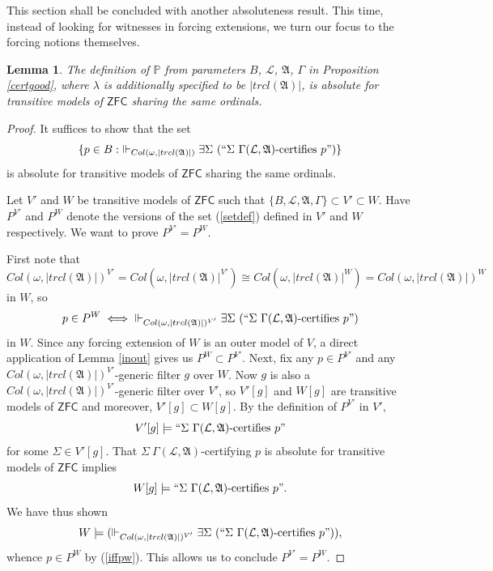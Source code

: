 \documentclass[12pt, twoside]{memoir}
\numberwithin{equation}{section}
\newtheorem{lem}[thm]{Lemma}
\theoremstyle{definition}
\theoremstyle{remark}
\theoremstyle{definition}
\theoremstyle{definition}
\theoremstyle{definition}
\theoremstyle{remark}
\begin{document}
This section shall be concluded with another absoluteness result. This time, instead of looking for witnesses in forcing extensions, we turn our focus to the forcing notions themselves.

\begin{lem}\label{Pisabs}
The definition of $\mathbb{P}$ from parameters $B$, $\mathcal{L}$, $\mathfrak{A}$, $\Gamma$ in Proposition \ref{certgood}, where $\lambda$ is additionally specified to be $|trcl(\mathfrak{A})|$, is absolute for transitive models of $\mathsf{ZFC}$ sharing the same ordinals.
\end{lem}

\begin{proof}
It suffices to show that the set 
\begin{equation}\label{setdef}
    \{p \in B : \ \Vdash_{Col(\omega, |trcl(\mathfrak{A})|)} \exists \Sigma \ (``\Sigma \ \Gamma(\mathcal{L}, \mathfrak{A}) \text{-certifies } p")\}
\end{equation}
is absolute for transitive models of $\mathsf{ZFC}$ sharing the same ordinals. 

Let $V'$ and $W$ be transitive models of $\mathsf{ZFC}$ such that $\{B, \mathcal{L}, \mathfrak{A}, \Gamma\} \subset V' \subset W$. Have $P^{V'}$ and $P^W$ denote the versions of the set (\ref{setdef}) defined in $V'$ and $W$ respectively. We want to prove $P^{V'} = P^W$. 

First note that $$ Col(\omega, |trcl(\mathfrak{A})|)^{V'} = Col(\omega, |trcl(\mathfrak{A})|^{V'}) \cong Col(\omega, |trcl(\mathfrak{A})|^W) = Col(\omega, |trcl(\mathfrak{A})|)^W$$ in $W$, so 
\begin{equation}\label{iffpw}
    p \in P^W \iff \ \Vdash_{Col(\omega, |trcl(\mathfrak{A})|)^{V'}} \exists \Sigma \ (``\Sigma \ \Gamma(\mathcal{L}, \mathfrak{A}) \text{-certifies } p")
\end{equation}
in $W$. Since any forcing extension of $W$ is an outer model of $V$, a direct application of Lemma \ref{inout} gives us $P^W \subset P^{V'}$. Next, fix any $p \in P^{V'}$ and any $Col(\omega, |trcl(\mathfrak{A})|)^{V'}$-generic filter $g$ over $W$. Now $g$ is also a $Col(\omega, |trcl(\mathfrak{A})|)^{V'}$-generic filter over $V'$, so $V'[g]$ and $W[g]$ are transitive models of $\mathsf{ZFC}$ and moreover, $V'[g] \subset W[g]$. By the definition of $P^{V'}$ in $V'$, $$V'[g] \models ``\Sigma \ \Gamma(\mathcal{L}, \mathfrak{A}) \text{-certifies } p"$$ for some $\Sigma \in V'[g]$. That $\Sigma \ \Gamma(\mathcal{L}, \mathfrak{A})$-certifying $p$ is absolute for transitive models of $\mathsf{ZFC}$ implies $$W[g] \models ``\Sigma \ \Gamma(\mathcal{L}, \mathfrak{A}) \text{-certifies } p".$$ We have thus shown $$W \models (\Vdash_{Col(\omega, |trcl(\mathfrak{A})|)^{V'}} \exists \Sigma \ (``\Sigma \ \Gamma(\mathcal{L}, \mathfrak{A}) \text{-certifies } p")),$$ whence $p \in P^W$ by (\ref{iffpw}). This allows us to conclude $P^{V'} = P^W$.
\end{proof}
\end{document}
